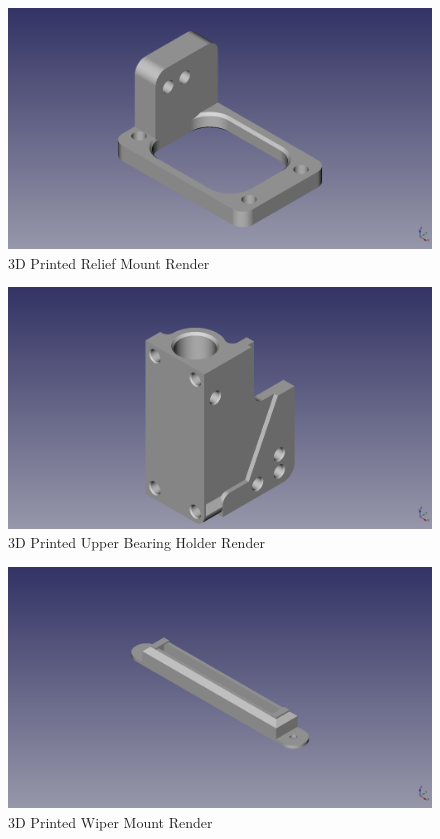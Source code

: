 \begin{figure}[H]
\centering
\includegraphics[keepaspectratio=true,angle=0,height=1.0\textheight,width=1.0\textwidth]{STL/reliefmount.stl.png}
\caption{3D Printed Relief Mount Render}
\label{fig:reliefmountrender}
\end{figure}

\begin{figure}[H]
\centering
\includegraphics[keepaspectratio=true,angle=0,height=1.0\textheight,width=1.0\textwidth]{STL/upperbearingholder.stl.png}
\caption{3D Printed Upper Bearing Holder Render}
\label{fig:upperbearingholderrender}
\end{figure}

\begin{figure}[H]
\centering
\includegraphics[keepaspectratio=true,angle=0,height=1.0\textheight,width=1.0\textwidth]{STL/wipermount.stl.png}
\caption{3D Printed Wiper Mount Render}
\label{fig:wipermountrender}
\end{figure}

